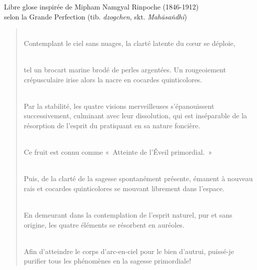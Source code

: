 \newpage

\begin{center}
\large
Libre glose inspirée de Mipham Namgyal Rinpoche (1846-1912)\\
selon la Grande Perfection (tib. \emph{dzogchen},
skt. \emph{Mah\={a}sa\.{n}dhi})
\end{center}

\bigskip\bigskip

\begin{verse}
\\
Contemplant le ciel sans nuages, la clarté latente du cœur se
  déploie,

\medskip

\\
tel un brocart marine brodé de perles argentées. Un rougeoiement
  crépusculaire irise alors la nacre en cocardes quinticolores.

\medskip

\\
Par la stabilité, les quatre visions merveilleuses s'épanouissent
 successivement, culminant avec leur dissolution, qui est inséparable
 de la résorption de l'esprit du pratiquant en sa nature foncière.

\medskip

\\
Ce fruit est connu comme «~Atteinte de l'Éveil primordial.~»

\medskip

\\
Puis, de la clarté de la sagesse spontanément présente, émanent à
  nouveau rais et cocardes quinticolores se mouvant librement dans
  l'espace.

\medskip

\\
En demeurant dans la contemplation de l'esprit naturel, pur et sans
  origine, les quatre éléments se résorbent en auréoles.

\medskip

\\
Afin d'atteindre le corps d'arc-en-ciel pour le bien d'autrui,
puissé-je purifier tous les phénomènes en la sagesse primordiale!

\end{verse}
